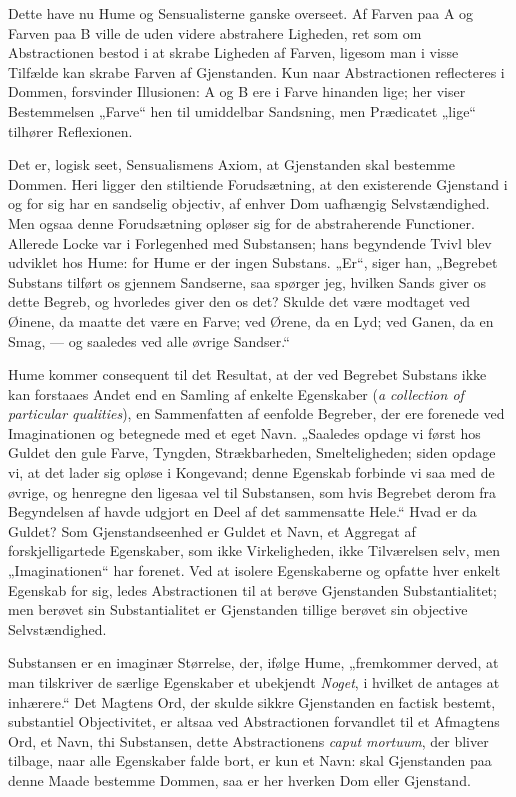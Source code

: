 \documentclass[12pt]{book}
\newcommand{\opage}[1]{\marginnote{\footnotesize\textit{[#1]}}}
\begin{document}
Dette have nu Hume og Sensualisterne ganske overseet.
Af Farven paa A og Farven paa B ville de uden videre abstrahere
Ligheden, ret som om Abstractionen bestod i at skrabe
Ligheden af Farven, ligesom man i visse Tilfælde kan skrabe
Farven af Gjenstanden. Kun naar Abstractionen reflecteres
i Dommen, forsvinder Illusionen: A og B ere i Farve hinanden
lige; her viser Bestemmelsen „Farve“ hen til umiddelbar
Sandsning, men Prædicatet „lige“ tilhører Reflexionen.

Det er, logisk seet, Sensualismens Axiom, at Gjenstanden
skal bestemme Dommen. Heri ligger den stiltiende Forudsætning,
at den existerende Gjenstand i og for sig har en
sandselig objectiv, af enhver Dom uafhængig Selvstændighed.
Men ogsaa denne Forudsætning opløser sig for de abstraherende
Functioner. Allerede Locke var i Forlegenhed med
Substansen; hans begyndende Tvivl blev udviklet hos Hume:
for Hume er der ingen Substans. „Er“, siger han, „Begrebet
Substans tilført os gjennem Sandserne, saa spørger
\opage{112}jeg, hvilken Sands giver os dette Begreb, og hvorledes giver
den os det? Skulde det være modtaget ved Øinene, da
maatte det være en Farve; ved Ørene, da en Lyd; ved Ganen,
da en Smag, --- og saaledes ved alle øvrige Sandser.“

Hume kommer consequent til det Resultat, at der ved
Begrebet Substans ikke kan forstaaes Andet end en Samling
af enkelte Egenskaber (\textit{a collection of particular qualities}),
en Sammenfatten af eenfolde Begreber, der ere forenede ved
Imaginationen og betegnede med et eget Navn. „Saaledes
opdage vi først hos Guldet den gule Farve, Tyngden, Strækbarheden,
Smelteligheden; siden opdage vi, at det lader sig
opløse i Kongevand; denne Egenskab forbinde vi saa med de
øvrige, og henregne den ligesaa vel til Substansen, som hvis
Begrebet derom fra Begyndelsen af havde udgjort en Deel
af det sammensatte Hele.“ Hvad er da Guldet? Som Gjenstandseenhed
er Guldet et Navn, et Aggregat af forskjelligartede
Egenskaber, som ikke Virkeligheden, ikke Tilværelsen selv,
men „Imaginationen“ har forenet. Ved at isolere Egenskaberne
og opfatte hver enkelt Egenskab for sig, ledes Abstractionen til
at berøve Gjenstanden Substantialitet; men berøvet sin Substantialitet
er Gjenstanden tillige berøvet sin objective Selvstændighed.

Substansen er en imaginær Størrelse, der, ifølge Hume,
„fremkommer derved, at man tilskriver de særlige Egenskaber
et ubekjendt \emph{Noget}, i hvilket de antages at inhærere.“ Det
Magtens Ord, der skulde sikkre Gjenstanden en factisk bestemt,
substantiel Objectivitet, er altsaa ved Abstractionen forvandlet
til et Afmagtens Ord, et Navn, thi Substansen, dette Abstractionens
\textit{caput mortuum}, der bliver tilbage, naar alle Egenskaber
falde bort, er kun et Navn: skal Gjenstanden paa denne Maade
bestemme Dommen, saa er her hverken Dom eller Gjenstand.
\end{document}

